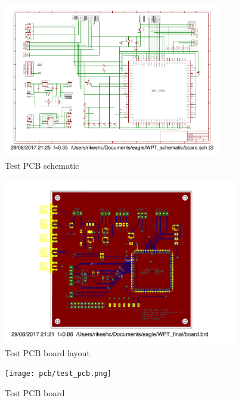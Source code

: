 \begin{appendices}
\begin{figure} [!htbp]	%
 	\centering
  	\includegraphics[width=0.85\textwidth]{appendix/pcb_schematic.pdf} 
 	\caption{Test PCB schematic} 
	\label{fig:appen_schemtic_pcb} 
\end{figure}


\begin{figure} [!htbp]
 	\centering
  	\includegraphics[width=0.92\textwidth]{appendix/pcb_board.pdf} 
 	\caption{Test PCB board layout} 
	\label{fig:appen_board_pcb_layout} 
\end{figure}

\begin{figure} [!htbp] 	%
 	\centering
  	\texttt{[image: pcb/test\_pcb.png]} 
 	\caption{Test PCB board} 
	\label{fig:appen_board_pcb} 
\end{figure}

\end{appendices} %
